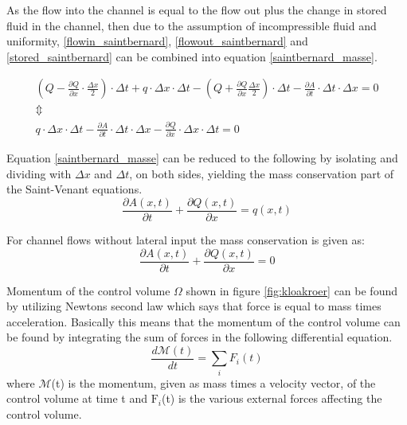 As the flow into the channel is equal to the flow out plus the change in stored fluid in the channel, then due to the assumption of incompressible fluid and uniformity, \ref{flowin_saintbernard}, \ref{flowout_saintbernard} and \ref{stored_saintbernard} can be combined into equation \ref{saintbernard_masse}. 

\begin{equation}
\begin{array}{l}
	\left(Q - \frac{\partial Q}{\partial x}\cdot \frac{\Delta x}{2}\right) \cdot \Delta t + q \cdot \Delta x \cdot \Delta t - \left(Q + \frac{\partial Q}{ \partial x} \frac{\Delta x}{2} \right) \cdot \Delta t - \frac{\partial A}{\partial t}\cdot \Delta t 
	\cdot \Delta x = 0 \\ 
\Updownarrow \\
q \cdot \Delta x \cdot \Delta t -\frac{\partial A}{\partial t} \cdot \Delta t 
	\cdot \Delta x - \frac{\partial Q}{\partial x} \cdot \Delta x \cdot \Delta t  = 0 
\end{array}
\label{saintbernard_masse}
\end{equation}

Equation \ref{saintbernard_masse} can be reduced to the following by isolating and dividing with $\Delta x$ and $\Delta t$, on both sides, yielding the mass conservation part of the Saint-Venant equations.
\begin{equation}	
\frac{\partial A(x,t)}{\partial t} + \frac{\partial Q(x,t)}{\partial x}=q(x,t)
\label{saintbernard_mass_lateral}
\end{equation}

For channel flows without lateral input the mass conservation is given as:
\begin{equation}	
\frac{\partial A(x,t)}{\partial t} + \frac{\partial Q(x,t)}{\partial x}=0
\label{saintbernard_mass}
\end{equation}

Momentum of the control volume $\Omega$ shown in figure \ref{fig:kloakroer} can be found by utilizing Newtons second law which says that force is equal to mass times acceleration.
Basically this means that the momentum of the control volume can be found by integrating the sum of forces in the following differential equation.
\begin{equation}
	\frac{d \mathcal{M}(t)}{dt} = \sum_{i}F_i(t)
\end{equation} 
where $\mathcal{M}$(t) is the momentum, given as mass times a velocity vector, of the control volume at time t and $\text{F}_i$(t) is the various external forces affecting the control volume.

